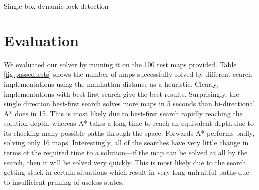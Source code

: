 \documentclass[a4paper,11pt]{article}
\begin{document}
\begin{algorithm}
  \DontPrintSemicolon
  
  
\caption{Single box dynamic lock detection}
\label{alg:dynamiclocks}
\end{algorithm}

\section{Evaluation}
We evaluated our solver by running it on the 100 test maps provided. Table
\ref{fig:passedtests} shows the number of maps successfully solved by different
search implementations using the manhattan distance as a heuristic. Clearly,
implementations with best-first search give the best results. Surprisingly, the
single direction best-first search solves more maps in 5 seconds than
bi-directional A* does in 15. This is most likely due to best-first search
rapidly reaching the solution depth, whereas A* takes a long time to reach an
equivalent depth due to its checking many possible paths through the
space. Forwards A* performs badly, solving only 16 maps. Interestingly, all of
the searches have very little change in terms of the required time to a
solution---if the map can be solved at all by the search, then it will be solved
very quickly. This is most likely due to the search getting stuck in certain
situations which result in very long unfruitful paths due to insufficient
pruning of useless states.
\end{document}
